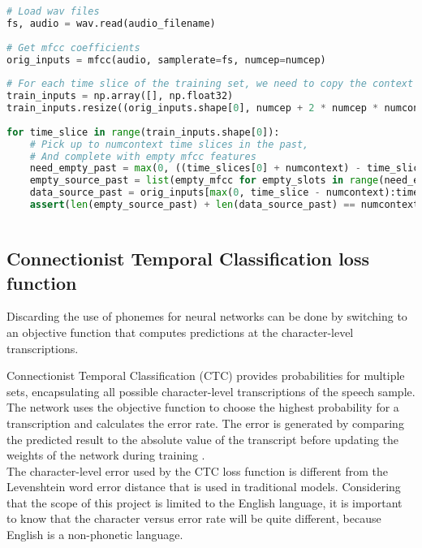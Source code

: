 \begin{lstlisting}[language = Python, label=lst:MFCC, caption = Example code to obtain MFCC features.]
# Load wav files
fs, audio = wav.read(audio_filename)
 
# Get mfcc coefficients
orig_inputs = mfcc(audio, samplerate=fs, numcep=numcep)
 
# For each time slice of the training set, we need to copy the context this makes
train_inputs = np.array([], np.float32)
train_inputs.resize((orig_inputs.shape[0], numcep + 2 * numcep * numcontext))
 
for time_slice in range(train_inputs.shape[0]):
    # Pick up to numcontext time slices in the past,
    # And complete with empty mfcc features
    need_empty_past = max(0, ((time_slices[0] + numcontext) - time_slice))
    empty_source_past = list(empty_mfcc for empty_slots in range(need_empty_past))
    data_source_past = orig_inputs[max(0, time_slice - numcontext):time_slice]
    assert(len(empty_source_past) + len(data_source_past) == numcontext)
    
\end{lstlisting}
 
\subsection{Connectionist Temporal Classification loss function}
 Discarding the use of phonemes for neural networks can be done by switching to an
 objective function that computes predictions at the character-level transcriptions.
 
 Connectionist Temporal Classification (CTC) provides probabilities for multiple sets, encapsulating all possible character-level transcriptions of the speech sample.
 The network uses the objective function to choose the highest probability for a transcription and calculates the error rate. The error is generated by comparing the 
 predicted result to the absolute value of the transcript before updating the weights
 of the network during training \cite{Great}. \\
 
The character-level error used by the CTC loss function is different from the Levenshtein \cite{stratonovich1960conditional} word error distance that is used in traditional models. Considering that the scope of this project is limited to the English language, it is important to know
that the character versus error rate will be quite different, because English is a
non-phonetic language.

